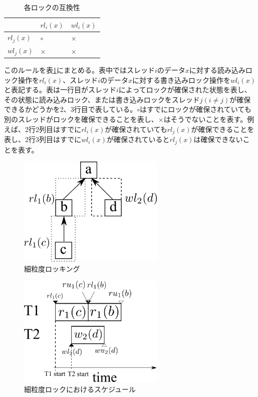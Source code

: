\documentclass[a4paper]{jreport}	%
\begin{document}
\begin{table}[h!]
\centering
\begin{tabular}{ | m{1cm} | m{1cm} | m{1cm} | } 
  \hline
  & $rl_i(x)$ & $wl_i(x)$ \\ 
  \hline
  $rl_j(x)$ & $\circ$ & $\times$ \\ 
  \hline
  $wl_j(x)$ &  $\times$ & $\times$ \\ 
  \hline
\end{tabular}	
\caption{各ロックの互換性}
\label{table:lock-table}
\end{table}


このルールを表\ref{table:lock-table}にまとめる。表中ではスレッド$i$のデータ$x$に対する読み込みロック操作を$rl_i(x)$、スレッド$i$のデータ$x$に対する書き込みロック操作を$wl_i(x)$と表記する。表は一行目がスレッド$i$によってロックが確保された状態を表し、その状態に読み込みロック、または書き込みロックをスレッド$j(i \neq j)$が確保できるかどうかを2、3行目で表している。$\circ$はすでにロックが確保されていても別のスレッドがロックを確保できることを表し、$\times$はそうでないことを表す。例えば、2行2列目はすでに$rl_i(x)$が確保されていても$rl_j(x)$が確保できることを表し、2行3列目はすでに$wl_i(x)$が確保されていると$rl_j(x)$は確保できないことを表す。

\begin{figure}[h] 
\centering
\includegraphics[width=7cm]{high-gran-lock}
\caption{細粒度ロッキング}
\label{fig:high-gran-lock}
\end{figure}


\begin{figure}[h] 
\centering
\includegraphics[width=7cm]{high-gran-time}
\caption{細粒度ロックにおけるスケジュール}
\label{fig:high-gran-time}
\end{figure}
\end{document}
